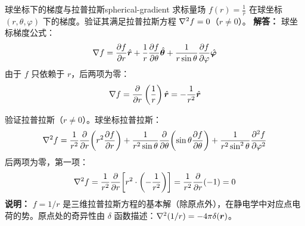 \begin{example}{球坐标下的梯度与拉普拉斯}{spherical-gradient}
求标量场 $f(r)=\frac{1}{r}$ 在球坐标 $(r,\theta,\varphi)$ 下的梯度。验证其满足拉普拉斯方程 $\nabla^2 f=0$（$r\neq 0$）。
\tcblower
\textbf{解答：}
球坐标梯度公式：
\[
\nabla f = \frac{\partial f}{\partial r}\hat{\bm{r}} + \frac{1}{r}\frac{\partial f}{\partial\theta}\hat{\bm{\theta}} + \frac{1}{r\sin\theta}\frac{\partial f}{\partial\varphi}\hat{\bm{\varphi}}
\]
由于 $f$ 只依赖于 $r$，后两项为零：
\[
\nabla f = \frac{\partial}{\partial r}\left(\frac{1}{r}\right)\hat{\bm{r}} = -\frac{1}{r^2}\hat{\bm{r}}
\]

验证拉普拉斯（$r\neq 0$）。球坐标拉普拉斯：
\[
\nabla^2 f = \frac{1}{r^2}\frac{\partial}{\partial r}\!\left(r^2\frac{\partial f}{\partial r}\right) + \frac{1}{r^2\sin\theta}\frac{\partial}{\partial\theta}\!\left(\sin\theta\frac{\partial f}{\partial\theta}\right) + \frac{1}{r^2\sin^2\theta}\frac{\partial^2 f}{\partial\varphi^2}
\]
后两项为零，第一项：
\[
\nabla^2 f = \frac{1}{r^2}\frac{\partial}{\partial r}\!\left[r^2\cdot\left(-\frac{1}{r^2}\right)\right] = \frac{1}{r^2}\frac{\partial}{\partial r}(-1) = 0
\]
\textbf{说明：} $f=1/r$ 是三维拉普拉斯方程的基本解（除原点外），在静电学中对应点电荷的势。原点处的奇异性由 $\delta$ 函数描述：$\nabla^2(1/r)=-4\pi\delta(\bm{r})$。
\end{example}

